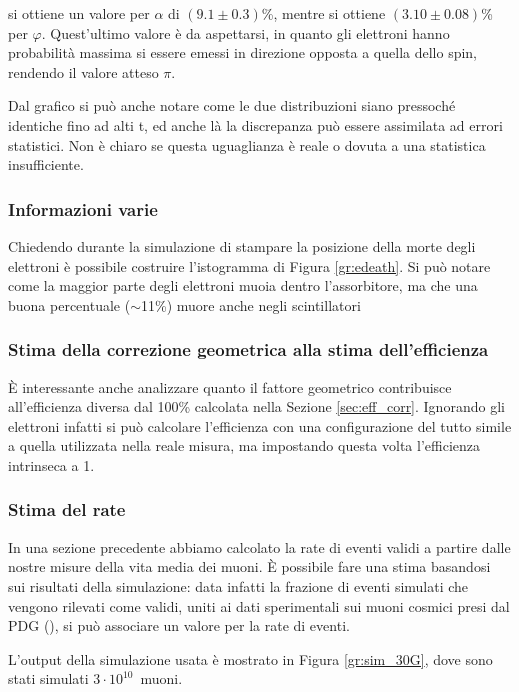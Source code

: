 si ottiene un valore per $\alpha$ di $(9.1 \pm 0.3)$\%, mentre si ottiene $(3.10 \pm 0.08)$\% per $\varphi$. Quest'ultimo valore \`e da aspettarsi, in quanto gli elettroni hanno probabilit\`a massima si essere emessi in direzione opposta a quella dello spin, rendendo il valore atteso $\pi$.

Dal grafico si pu\`o anche notare come le due distribuzioni siano pressoch\'e identiche fino ad alti t, ed anche l\`a la discrepanza pu\`o essere assimilata ad errori statistici. Non \`e chiaro se questa uguaglianza \`e reale o dovuta a una statistica insufficiente.

\subsubsection{Informazioni varie}
Chiedendo durante la simulazione di stampare la posizione della morte degli elettroni \`e possibile costruire l'istogramma di Figura \ref{gr:edeath}. Si pu\`o notare come la maggior parte degli elettroni muoia dentro l'assorbitore, ma che una buona percentuale ($\sim$11\%) muore anche negli scintillatori


\subsubsection{Stima della correzione geometrica alla stima dell'efficienza}
\`E interessante anche analizzare quanto il fattore geometrico contribuisce all'efficienza diversa dal 100\% calcolata nella Sezione \ref{sec:eff_corr}. Ignorando gli elettroni infatti si pu\`o calcolare l'efficienza con una configurazione del tutto simile a quella utilizzata nella reale misura, ma impostando questa volta l'efficienza intrinseca a 1.

\subsubsection{Stima del rate}
In una sezione precedente abbiamo calcolato la rate di eventi validi a partire dalle nostre misure della vita media dei muoni. 
\`E possibile fare una stima basandosi sui risultati della simulazione: data infatti la frazione di eventi simulati che vengono rilevati come validi, uniti ai dati sperimentali sui muoni cosmici presi dal PDG (\cite{bib:Patrignani:2016xqp}), si pu\`o associare un valore per la rate di eventi.

L'output della simulazione usata \`e mostrato in Figura \ref{gr:sim_30G}, dove sono stati simulati $3\cdot 10^{10}$~muoni.

